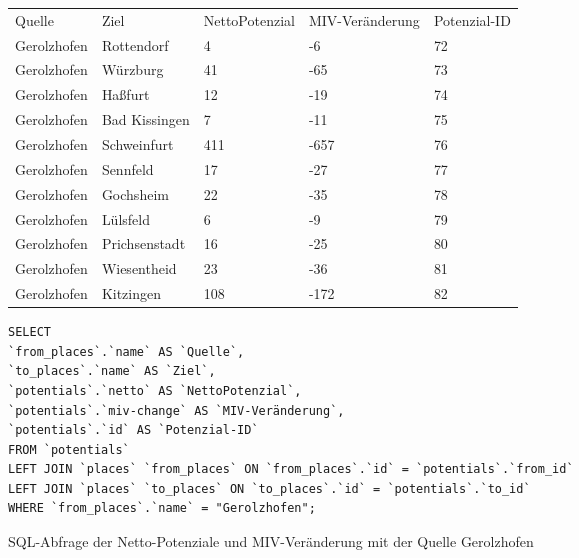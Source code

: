 \begin{tabularx}{\textwidth}{*5{X}}
Quelle & Ziel & NettoPotenzial & MIV-Veränderung & Potenzial-ID\\ 
Gerolzhofen & Rottendorf & 4 & -6 & 72\\ 
Gerolzhofen & Würzburg & 41 & -65 & 73\\ 
Gerolzhofen & Haßfurt & 12 & -19 & 74\\ 
Gerolzhofen & Bad Kissingen & 7 & -11 & 75\\ 
Gerolzhofen & Schweinfurt & 411 & -657 & 76\\ 
Gerolzhofen & Sennfeld & 17 & -27 & 77\\ 
Gerolzhofen & Gochsheim & 22 & -35 & 78\\ 
Gerolzhofen & Lülsfeld & 6 & -9 & 79\\ 
Gerolzhofen & Prichsenstadt & 16 & -25 & 80\\ 
Gerolzhofen & Wiesentheid & 23 & -36 & 81\\ 
Gerolzhofen & Kitzingen & 108 & -172 & 82\\ 
\end{tabularx}
\newline
\newline
\begin{listing}[htbp]
\begin{verbatim}
SELECT
`from_places`.`name` AS `Quelle`, 
`to_places`.`name` AS `Ziel`, 
`potentials`.`netto` AS `NettoPotenzial`, 
`potentials`.`miv-change` AS `MIV-Veränderung`, 
`potentials`.`id` AS `Potenzial-ID`
FROM `potentials`
LEFT JOIN `places` `from_places` ON `from_places`.`id` = `potentials`.`from_id`
LEFT JOIN `places` `to_places` ON `to_places`.`id` = `potentials`.`to_id`
WHERE `from_places`.`name` = "Gerolzhofen";
\end{verbatim}
\caption{SQL-Abfrage der Netto-Potenziale und MIV-Veränderung mit der Quelle Gerolzhofen}\label{lst-fz-gerolzhofen}
\end{listing}
    